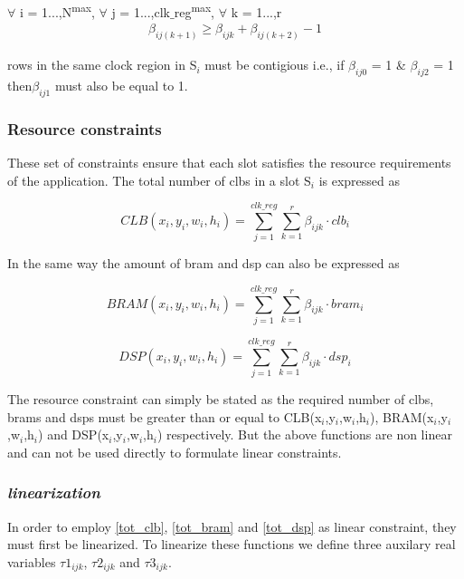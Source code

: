 \begin{constraint} $\forall$ i = 1...,N\textsuperscript{max}, $\forall$ j = 1...,clk$\_$reg\textsuperscript{max}, $\forall$ k = 1...,r
\begin{equation}
\begin{split}
\beta_{ij(k+1)} \geq \beta_{ijk} + \beta_{ij(k+2)} - 1 
\end{split}
\end{equation}
\end{constraint}

\begin{defn}
rows in the same clock region in S$_i$ must be contigious i.e., if $\beta_{ij0}$ = 1 \& $\beta_{ij2}$ = 1 then$\beta_{ij1}$ must also be equal to 1.
\end{defn}


\subsubsection{\textbf{Resource constraints}} 
These set of constraints ensure that each slot satisfies the resource requirements of the application. The total number of clbs in a slot S$_i$ is expressed as 

\begin{equation}
CLB(x_i,y_i,w_i,h_i) = \sum_{j=1}^{clk\_reg} \sum_{k=1}^{r} \beta_{ijk} \cdot clb_i 
\label{tot_clb}
\end{equation}

In the same way the amount of bram and dsp can also be expressed as 

\begin{equation}
BRAM(x_i,y_i,w_i,h_i) = \sum_{j=1}^{clk\_reg} \sum_{k=1}^{r} \beta_{ijk} \cdot bram_i 
\label{tot_bram}
\end{equation}


\begin{equation}
DSP(x_i,y_i,w_i,h_i) = \sum_{j=1}^{clk\_reg} \sum_{k=1}^{r} \beta_{ijk} \cdot dsp_i 
\label{tot_dsp}
\end{equation}

The resource constraint can simply be stated as the required number of clbs, brams and dsps must be greater than or equal to CLB(x$_i$,y$_i$,w$_i$,h$_i$), BRAM(x$_i$,y$_i$,w$_i$,h$_i$) and DSP(x$_i$,y$_i$,w$_i$,h$_i$) respectively. But the above functions are non linear and can not be used directly to formulate linear constraints.\\

\subsubsection*{\textit {linearization}}
In order to employ \ref{tot_clb}, \ref{tot_bram} and \ref{tot_dsp} as linear constraint, they must first be linearized. To linearize these functions we define three auxilary real variables $\tau1_{ijk}$, $\tau2_{ijk}$ and $\tau3_{ijk}$. \\

